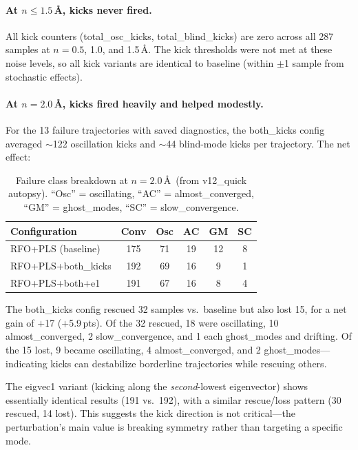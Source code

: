 \documentclass[11pt,a4paper]{article}
\theoremstyle{definition}
\begin{document}
\paragraph{At $n \leq 1.5$\,\AA, kicks never fired.}
All kick counters (total\_osc\_kicks, total\_blind\_kicks) are zero
across all 287 samples at $n=0.5$, 1.0, and 1.5\,\AA.  The kick
thresholds were not met at these noise levels, so all kick variants
are identical to baseline (within $\pm$1 sample from stochastic effects).

\paragraph{At $n=2.0$\,\AA, kicks fired heavily and helped modestly.}
For the 13 failure trajectories with saved diagnostics, the both\_kicks
config averaged $\sim$122 oscillation kicks and $\sim$44 blind-mode kicks
per trajectory.  The net effect:

\begin{table}[h]
\centering
\caption{Failure class breakdown at $n=2.0$\,\AA\ (from v12\_quick autopsy).
  ``Osc'' = oscillating, ``AC'' = almost\_converged, ``GM'' = ghost\_modes,
  ``SC'' = slow\_convergence.}
\label{tab:v12-kicks-autopsy}
\begin{tabular}{lccccc}
\toprule
Configuration & Conv & Osc & AC & GM & SC \\
\midrule
RFO+PLS (baseline)  & 175 & 71 & 19 & 12 &  8 \\
RFO+PLS+both\_kicks & 192 & 69 & 16 &  9 &  1 \\
RFO+PLS+both+e1     & 191 & 67 & 16 &  8 &  4 \\
\bottomrule
\end{tabular}
\end{table}

The both\_kicks config rescued 32 samples vs.\ baseline but also lost 15,
for a net gain of $+$17 ($+$5.9\,pts).  Of the 32 rescued, 18 were
oscillating, 10 almost\_converged, 2 slow\_convergence, and 1 each
ghost\_modes and drifting.  Of the 15 lost, 9 became oscillating, 4
almost\_converged, and 2 ghost\_modes---indicating kicks can destabilize
borderline trajectories while rescuing others.

The eigvec1 variant (kicking along the \emph{second}-lowest eigenvector)
shows essentially identical results (191 vs.\ 192), with a similar
rescue/loss pattern (30 rescued, 14 lost).  This suggests the kick
direction is not critical---the perturbation's main value is breaking
symmetry rather than targeting a specific mode.
\end{document}
